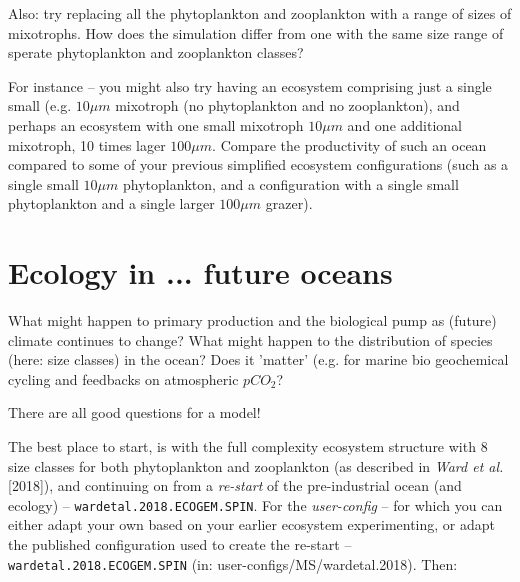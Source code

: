 \documentclass[11pt,fleqn]{book} %
\begin{document}
Also: try replacing all the phytoplankton and zooplankton with a range of sizes of mixotrophs. How does the simulation differ from one with the same size range of sperate phytoplankton and zooplankton classes?

For instance -- you might also try having an ecosystem comprising just a single small (e.g. \(10 \mu m\) mixotroph (no phytoplankton and no zooplankton), and perhaps an ecosystem with one small mixotroph \(10 \mu m\) and one additional mixotroph, 10 times lager \(100 \mu m\). Compare the productivity of such an ocean compared to some of your previous simplified ecosystem configurations (such as a single small \(10 \mu m\) phytoplankton, and a configuration with a single small phytoplankton and a single larger \(100 \mu m\) grazer).
%

\newpage


\section{Ecology in ... future oceans}

What might happen to primary production and the biological pump as (future) climate continues to change? What might happen to the distribution of species (here: size classes) in the ocean? Does it 'matter' (e.g. for marine bio geochemical cycling and feedbacks on atmospheric \(pCO_{2}\)?

\vspace{1mm}
There are all good questions for a model!

\vspace{1mm}
The best place to start, is with the full complexity ecosystem structure with 8 size classes for both phytoplankton and zooplankton (as described in \textit{Ward et al.} [2018]), and continuing on from a \textit{re-start} of the pre-industrial ocean (and ecology) -- \texttt{wardetal.2018.ECOGEM.SPIN}. For the \textit{user-config} -- for which you can either adapt your own based on your earlier ecosystem experimenting, or adapt the published configuration used to create the re-start -- \texttt{wardetal.2018.ECOGEM.SPIN} (in: \textsf{\footnotesize user-configs/MS/wardetal.2018}). Then:
\end{document}
